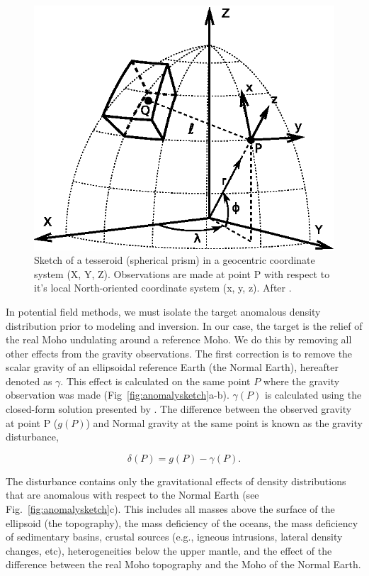 \documentclass[extra]{gji}
\begin{document}
\begin{figure}
    \centering
    \includegraphics{figures/tesseroid-coord-sys}
    \caption{Sketch of a tesseroid (spherical prism) in a geocentric coordinate
        system (X, Y, Z).
        Observations are made at point P with respect to it's local
        North-oriented coordinate system (x, y, z).
        After \citet{uieda2015}.
    }
    \label{fig:tesseroid}
\end{figure}


In potential field methods,
we must isolate the target anomalous density distribution prior to modeling and
inversion.
In our case, the target is the relief of the real Moho undulating around a
reference Moho.
We do this by removing all other effects from the gravity observations.
The first correction is to remove the
scalar gravity of an ellipsoidal reference Earth (the Normal Earth),
hereafter denoted as $\gamma$.
This effect is calculated on the same point $P$ where
the gravity observation was made
(Fig~\ref{fig:anomalysketch}a-b).
$\gamma(P)$ is calculated using
the closed-form solution presented by \citet{li2001a}.
The difference between the observed gravity at point P ($g(P)$)
and Normal gravity at the same point
is known as the gravity disturbance,

\begin{equation}
    \delta(P) = g(P) - \gamma(P).
    \label{eq:disturbance}
\end{equation}

The disturbance contains only the gravitational effects of density
distributions that are anomalous with respect to the Normal Earth
(see Fig.~\ref{fig:anomalysketch}c).
This includes all masses above the surface of the ellipsoid (the topography),
the mass deficiency of the oceans,
the mass deficiency of sedimentary basins,
crustal sources (e.g., igneous intrusions, lateral density changes, etc),
heterogeneities below the upper mantle,
and the effect of the difference between the real Moho
topography and the Moho of the Normal Earth.
\end{document}
